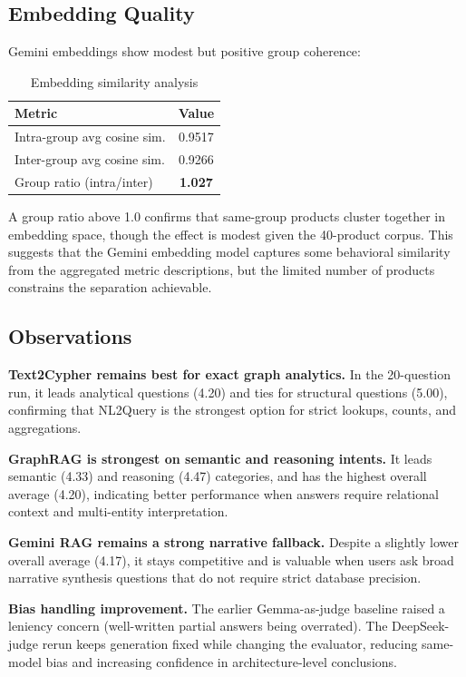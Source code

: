 \documentclass[11pt,a4paper]{article}
\begin{document}
\subsection{Embedding Quality}

Gemini embeddings show modest but positive group coherence:

\begin{table}[H]
\centering
\caption{Embedding similarity analysis}
\label{tab:embedding}
\begin{tabular}{lc}
\toprule
\textbf{Metric} & \textbf{Value} \\
\midrule
Intra-group avg cosine sim. & 0.9517 \\
Inter-group avg cosine sim. & 0.9266 \\
Group ratio (intra/inter) & \textbf{1.027} \\
\bottomrule
\end{tabular}
\end{table}

A group ratio above 1.0 confirms that same-group products cluster together in embedding space, though the effect is modest given the 40-product corpus. This suggests that the Gemini embedding model captures some behavioral similarity from the aggregated metric descriptions, but the limited number of products constrains the separation achievable.

\subsection{Observations}

\textbf{Text2Cypher remains best for exact graph analytics.} In the 20-question run, it leads analytical questions (4.20) and ties for structural questions (5.00), confirming that NL2Query is the strongest option for strict lookups, counts, and aggregations.

\textbf{GraphRAG is strongest on semantic and reasoning intents.} It leads semantic (4.33) and reasoning (4.47) categories, and has the highest overall average (4.20), indicating better performance when answers require relational context and multi-entity interpretation.

\textbf{Gemini RAG remains a strong narrative fallback.} Despite a slightly lower overall average (4.17), it stays competitive and is valuable when users ask broad narrative synthesis questions that do not require strict database precision.

\textbf{Bias handling improvement.} The earlier Gemma-as-judge baseline raised a leniency concern (well-written partial answers being overrated). The DeepSeek-judge rerun keeps generation fixed while changing the evaluator, reducing same-model bias and increasing confidence in architecture-level conclusions.
\end{document}
